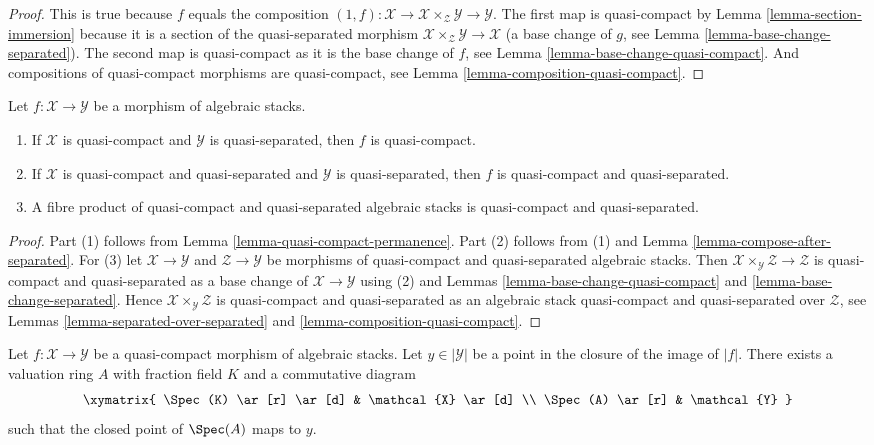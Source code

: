 \begin{proof}
This is true because $f$ equals the composition
$(1, f) : \mathcal{X} \to \mathcal{X} \times_\mathcal{Z} \mathcal{Y} \to
\mathcal{Y}$.
The first map is quasi-compact by
Lemma \ref{lemma-section-immersion}
because it is a section of the quasi-separated morphism
$\mathcal{X} \times_\mathcal{Z} \mathcal{Y} \to \mathcal{X}$
(a base change of $g$, see
Lemma \ref{lemma-base-change-separated}).
The second map is quasi-compact as it is the base change of $f$, see
Lemma \ref{lemma-base-change-quasi-compact}.
And compositions of quasi-compact
morphisms are quasi-compact, see Lemma \ref{lemma-composition-quasi-compact}.
\end{proof}

\begin{lemma}
\label{lemma-quasi-compact-quasi-separated-permanence}
Let $f : \mathcal{X} \to \mathcal{Y}$ be a morphism of algebraic stacks.
\begin{enumerate}
\item If $\mathcal{X}$ is quasi-compact and $\mathcal{Y}$ is
quasi-separated, then $f$ is quasi-compact.
\item If $\mathcal{X}$ is quasi-compact and quasi-separated and $\mathcal{Y}$
is quasi-separated, then $f$ is quasi-compact and quasi-separated.
\item A fibre product of quasi-compact and quasi-separated algebraic stacks
is quasi-compact and quasi-separated.
\end{enumerate}
\end{lemma}

\begin{proof}
Part (1) follows from
Lemma \ref{lemma-quasi-compact-permanence}.
Part (2) follows from (1) and
Lemma \ref{lemma-compose-after-separated}.
For (3) let $\mathcal{X} \to \mathcal{Y}$ and $\mathcal{Z} \to \mathcal{Y}$
be morphisms of quasi-compact and quasi-separated algebraic stacks.
Then $\mathcal{X} \times_\mathcal{Y} \mathcal{Z} \to \mathcal{Z}$
is quasi-compact and quasi-separated as a base change of
$\mathcal{X} \to \mathcal{Y}$ using (2) and
Lemmas \ref{lemma-base-change-quasi-compact} and
\ref{lemma-base-change-separated}.
Hence $\mathcal{X} \times_\mathcal{Y} \mathcal{Z}$
is quasi-compact and quasi-separated as
an algebraic stack quasi-compact and quasi-separated over
$\mathcal{Z}$, see
Lemmas \ref{lemma-separated-over-separated} and
\ref{lemma-composition-quasi-compact}.
\end{proof}

\begin{lemma}
\label{lemma-reach-points-scheme-theoretic-image}
Let $f : \mathcal{X} \to \mathcal{Y}$ be a quasi-compact morphism of
algebraic stacks. Let $y \in |\mathcal{Y}|$ be a point in the closure
of the image of $|f|$. There exists a valuation ring $A$ with
fraction field $K$ and a commutative diagram
$$
\xymatrix{
\Spec(K) \ar[r] \ar[d] & \mathcal{X} \ar[d] \\
\Spec(A) \ar[r] & \mathcal{Y}
}
$$
such that the closed point of $\Spec(A)$ maps to $y$.
\end{lemma}

